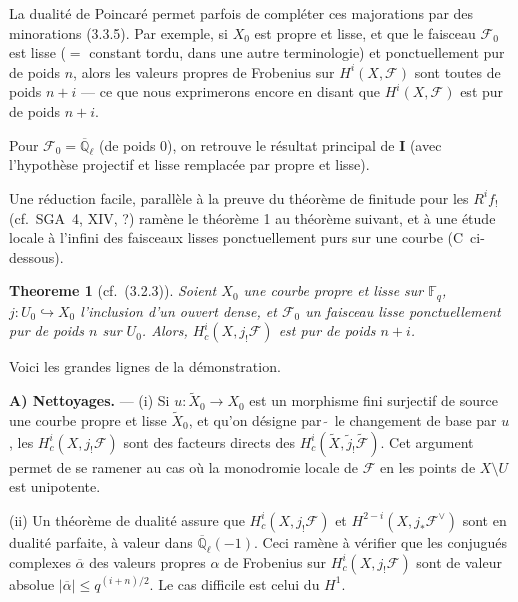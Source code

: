 \documentclass[12pt,a4paper]{article}
\theoremstyle{plain}
\newtheorem{theoreme}{Theoreme}[section]
\theoremstyle{definition}
\theoremstyle{definition}
\theoremstyle{remark}
\begin{document}
La dualit\'e de Poincar\'e permet parfois de compl\'eter ces majorations par des minorations (3.3.5). Par exemple, si $X_0$ est propre et lisse, et que le faisceau $\mathscr{F}_0$ est lisse ($=$ constant tordu, dans une autre terminologie) et ponctuellement pur de poids $n$, alors les valeurs propres de Frobenius sur $H^i(X, \mathscr{F})$ sont toutes de poids $n+i$ --- ce que nous exprimerons encore en disant que $H^i(X, \mathscr{F})$ est pur de poids $n+i$.

Pour $\mathscr{F}_0 = \overline{\mathbb{Q}}_\ell$ (de poids $0$), on retrouve le r\'esultat principal de \textbf{I} (avec l'hypoth\`ese projectif et lisse remplac\'ee par propre et lisse).

Une r\'eduction facile, parall\`ele \`a la preuve du th\'eor\`eme de finitude pour les $R^i f_!$ (cf.~SGA~4, XIV, ?) ram\`ene le th\'eor\`eme 1 au th\'eor\`eme suivant, et \`a une \'etude locale \`a l'infini des faisceaux lisses ponctuellement purs sur une courbe (C~ci-dessous).

\begin{theoreme}[cf.~(3.2.3)]
Soient $X_0$ une courbe propre et lisse sur $\mathbb{F}_q$, $j: U_0 \hookrightarrow X_0$ l'inclusion d'un ouvert dense, et $\mathscr{F}_0$ un faisceau lisse ponctuellement pur de poids $n$ sur $U_0$. Alors, $H_c^i(X, j_! \mathscr{F})$ est pur de poids $n+i$.
\end{theoreme}

Voici les grandes lignes de la d\'emonstration.

\medskip
\textbf{A) Nettoyages.} --- (i) Si $u: \widetilde{X}_0 \to X_0$ est un morphisme fini surjectif de source une courbe propre et lisse $\widetilde{X}_0$, et qu'on d\'esigne par $\widetilde{\;}$ le changement de base par $u$, les $H_c^i(X, j_! \mathscr{F})$ sont des facteurs directs des $H_c^i(\widetilde{X}, \tilde{j}_! \widetilde{\mathscr{F}})$. Cet argument permet de se ramener au cas o\`u la monodromie locale de $\mathscr{F}$ en les points de $X \setminus U$ est unipotente.

(ii) Un th\'eor\`eme de dualit\'e assure que $H_c^i(X, j_! \mathscr{F})$ et $H^{2-i}(X, j_* \mathscr{F}^\vee)$ sont en dualit\'e parfaite, \`a valeur dans $\overline{\mathbb{Q}}_\ell(-1)$. Ceci ram\`ene \`a v\'erifier que les conjugu\'es complexes $\overline{\alpha}$ des valeurs propres $\alpha$ de Frobenius sur $H_c^i(X, j_! \mathscr{F})$ sont de valeur absolue $|\overline{\alpha}| \leq q^{(i+n)/2}$. Le cas difficile est celui du $H^1$.
\end{document}
